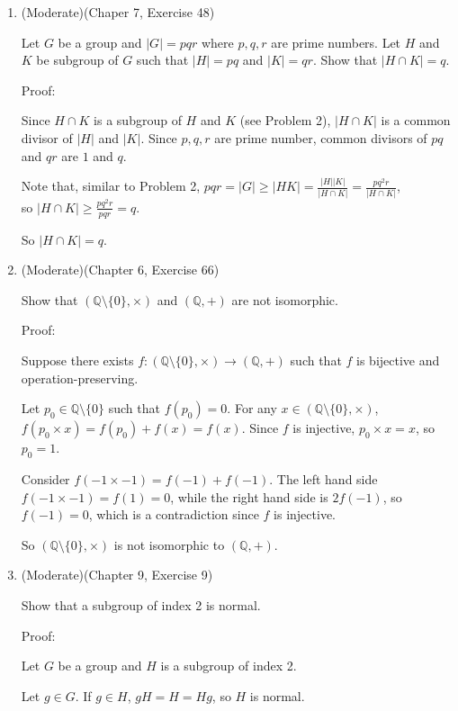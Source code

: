 \documentclass[12pt]{article}
\newcommand{\Q}{\mathbb{Q}}
\begin{document}
\begin{enumerate}
    \item (Moderate)(Chaper 7, Exercise 48) 
    
        Let $G$ be a group and $|G| = pqr$ where $p,q,r$ are prime numbers. Let $H$ and $K$ be subgroup of $G$ such that $|H| = pq$ and $|K| = qr$. Show that $|H \cap K| = q$. 
        
        Proof:

        Since $H \cap K$ is a subgroup of $H$ and $K$ (see Problem 2), $|H \cap K|$ is a common divisor of $|H|$ and $|K|$. Since $p,q,r$ are prime number, common divisors of $pq$ and $qr$ are $1$ and $q$.

        Note that, similar to Problem 2, $pqr = |G| \geq |HK| = \frac{|H||K|}{|H \cap K|} = \frac{pq^2r}{|H \cap K|}$,\\ so $|H \cap K| \geq \frac{pq^2r}{pqr} = q$. 

        So $|H \cap K| = q$. 
        \pagebreak

    \item (Moderate)(Chapter 6, Exercise 66) 
    
        Show that $(\Q \setminus \{0\} , \times)$ and $(\Q, +)$ are not isomorphic.

        Proof:

        Suppose there exists $f:(\Q \setminus \{0\} , \times) \to (\Q, +)$ such that $f$ is bijective and operation-preserving. 

        Let $p_0 \in \Q \setminus \{0\}$ such that $f(p_0) = 0$. For any $x \in(\Q \setminus \{0\} , \times)$, \\$f(p_0 \times x ) = f(p_0) + f(x) = f(x)$. Since $f$ is injective, $p_0 \times x = x$, so $p_0 = 1$. 

        Consider $f(-1 \times -1) = f(-1) + f(-1)$. The left hand side $f(-1 \times -1) = f(1) = 0$, while the right hand side is $2f(-1)$, so $f(-1) = 0$, which is a contradiction since $f$ is injective. 

        So $(\Q\setminus\{0\}, \times)$ is not isomorphic to $(\Q, +)$.
        \pagebreak

    \item (Moderate)(Chapter 9, Exercise 9) 
    
        Show that a subgroup of index 2 is normal. 
    
        Proof:

        Let $G$ be a group and $H$ is a subgroup of index 2.

        Let $g \in G$. If $g \in H$, $gH = H = Hg$, so $H$ is normal. 


\end{enumerate}
\end{document}
